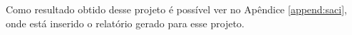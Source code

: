 Como resultado obtido desse projeto é possível ver no Apêndice \ref{append:saci}, onde está inserido o relatório gerado para esse projeto.











